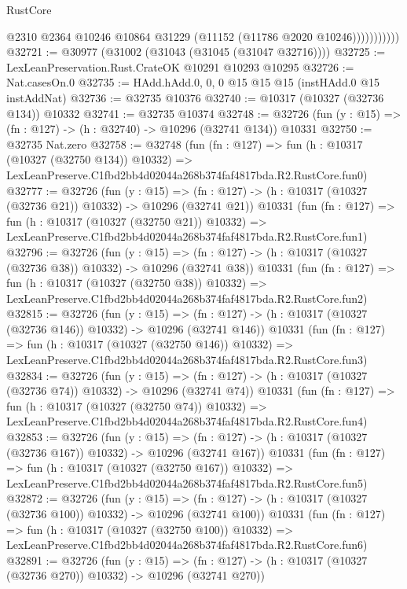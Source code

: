 \begin{lexlean}{RustCore}
\begin{coremodule}
                      @2310
                      @2364
                      @10246
                      @10864
                      @31229
                      (@11152 (@11786 @2020 @10246)))))))))))
@32721 := @30977 (@31002 (@31043 (@31045 (@31047 @32716))))
@32725 := LexLeanPreservation.Rust.CrateOK @10291 @10293 @10295
@32726 := Nat.casesOn.{0}
@32735 := HAdd.hAdd.{0, 0, 0} @15 @15 @15 (instHAdd.{0} @15 instAddNat)
@32736 := @32735 @10376
@32740 := @10317 (@10327 (@32736 @134)) @10332
@32741 := @32735 @10374
@32748 := @32726 (fun (y : @15) => (fn : @127) -> (h : @32740) -> @10296 (@32741 @134)) @10331
@32750 := @32735 Nat.zero
@32758 := @32748
    (fun (fn : @127) =>
    fun (h : @10317 (@10327 (@32750 @134)) @10332) =>
    LexLeanPreserve.C1fbd2bb4d02044a268b374faf4817bda.R2.RustCore.fun0)
@32777 := @32726
    (fun (y : @15) =>
    (fn : @127) -> (h : @10317 (@10327 (@32736 @21)) @10332) -> @10296 (@32741 @21))
    @10331
    (fun (fn : @127) =>
    fun (h : @10317 (@10327 (@32750 @21)) @10332) =>
    LexLeanPreserve.C1fbd2bb4d02044a268b374faf4817bda.R2.RustCore.fun1)
@32796 := @32726
    (fun (y : @15) =>
    (fn : @127) -> (h : @10317 (@10327 (@32736 @38)) @10332) -> @10296 (@32741 @38))
    @10331
    (fun (fn : @127) =>
    fun (h : @10317 (@10327 (@32750 @38)) @10332) =>
    LexLeanPreserve.C1fbd2bb4d02044a268b374faf4817bda.R2.RustCore.fun2)
@32815 := @32726
    (fun (y : @15) =>
    (fn : @127) -> (h : @10317 (@10327 (@32736 @146)) @10332) -> @10296 (@32741 @146))
    @10331
    (fun (fn : @127) =>
    fun (h : @10317 (@10327 (@32750 @146)) @10332) =>
    LexLeanPreserve.C1fbd2bb4d02044a268b374faf4817bda.R2.RustCore.fun3)
@32834 := @32726
    (fun (y : @15) =>
    (fn : @127) -> (h : @10317 (@10327 (@32736 @74)) @10332) -> @10296 (@32741 @74))
    @10331
    (fun (fn : @127) =>
    fun (h : @10317 (@10327 (@32750 @74)) @10332) =>
    LexLeanPreserve.C1fbd2bb4d02044a268b374faf4817bda.R2.RustCore.fun4)
@32853 := @32726
    (fun (y : @15) =>
    (fn : @127) -> (h : @10317 (@10327 (@32736 @167)) @10332) -> @10296 (@32741 @167))
    @10331
    (fun (fn : @127) =>
    fun (h : @10317 (@10327 (@32750 @167)) @10332) =>
    LexLeanPreserve.C1fbd2bb4d02044a268b374faf4817bda.R2.RustCore.fun5)
@32872 := @32726
    (fun (y : @15) =>
    (fn : @127) -> (h : @10317 (@10327 (@32736 @100)) @10332) -> @10296 (@32741 @100))
    @10331
    (fun (fn : @127) =>
    fun (h : @10317 (@10327 (@32750 @100)) @10332) =>
    LexLeanPreserve.C1fbd2bb4d02044a268b374faf4817bda.R2.RustCore.fun6)
@32891 := @32726
    (fun (y : @15) =>
    (fn : @127) -> (h : @10317 (@10327 (@32736 @270)) @10332) -> @10296 (@32741 @270))

\end{coremodule}
\end{lexlean}
